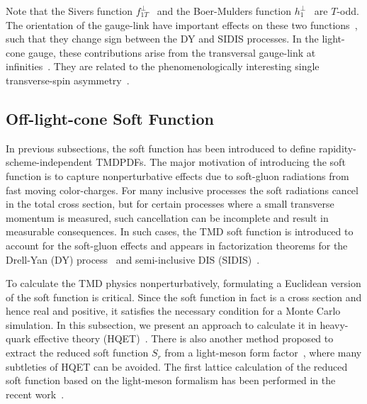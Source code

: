\documentclass[aps,rmp,reprint,amsmath,amssymb,graphicx,longbibliography]{revtex4-1} %
\begin{document}
Note that the Sivers function $f^\perp_{1T}$~\cite{Sivers:1989cc} and the Boer-Mulders function $h^\perp_1$~\cite{Boer:1997nt} are $T$-odd. The orientation of the gauge-link have important effects on these two functions~\cite{Collins:2002kn,Collins:2011zzd}, such that they change sign between the DY and SIDIS processes.  In the light-cone gauge, these contributions arise from the transversal gauge-link at infinities~\cite{Belitsky:2002sm}. They are related to the phenomenologically interesting single transverse-spin asymmetry~\cite{Boer:1997nt,Efremov:2004tp,Collins:2005ie,Collins:2005wb}.

\subsection{Off-light-cone Soft Function}
\label{sec:offlight}
In previous subsections, the soft function has been introduced to define rapidity-scheme-independent
TMDPDFs. The major motivation of introducing the soft function is to capture nonperturbative effects due to
soft-gluon radiations from fast moving color-charges.
For many inclusive processes the soft radiations cancel in the total cross section, but for certain processes where a small transverse momentum is measured, such cancellation can be incomplete and result in measurable consequences.
In such cases, the TMD soft function is introduced to account for the soft-gluon effects
and appears in factorization theorems for the Drell-Yan (DY) process~\cite{Collins:1984kg,Collins:1988ig}
and semi-inclusive DIS (SIDIS)~\cite{Ji:2004wu,Ji:2004xq}.

To calculate the TMD physics nonperturbatively, formulating
a Euclidean version of the soft function is critical. Since the soft function in fact is a cross section and hence real and positive,
it satisfies the necessary condition for a Monte Carlo simulation. In this subsection, we present an approach to calculate it
in heavy-quark effective theory (HQET)~\cite{Ji:2019sxk}. There is also another method proposed to extract the reduced soft function $S_r$ from a light-meson form factor~\cite{Ji:2019sxk}, where many subtleties of HQET can be avoided. The first lattice calculation of the reduced soft function based on the light-meson formalism has been performed in the recent work~\cite{Zhang:2020dbb}.
\end{document}

